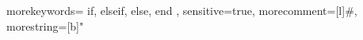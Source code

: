 \usepackage{listings}
\usepackage[usenames,dvipsnames]{xcolor}

{
	morekeywords={
		if, elseif, else, end
	},
	sensitive=true,      %
	morecomment=[l]{\#}, %
	morestring=[b]"
}

